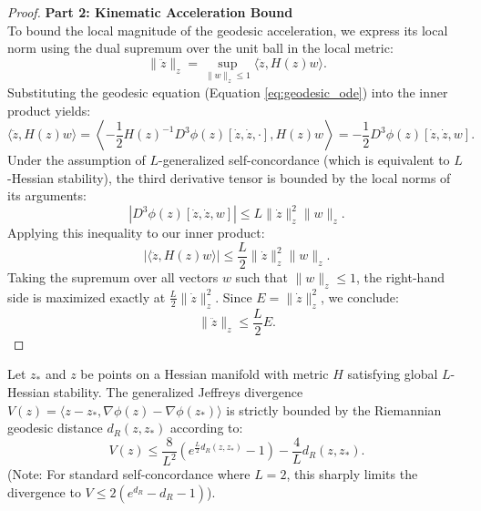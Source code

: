 \begin{proof}
\noindent \textbf{Part 2: Kinematic Acceleration Bound}\\
To bound the local magnitude of the geodesic acceleration, we express its local norm using the dual supremum over the unit ball in the local metric:
\begin{equation}
    \|\ddot{z}\|_z = \sup_{\|w\|_z \le 1} \langle \ddot{z}, H(z)w \rangle.
\end{equation}
Substituting the geodesic equation (Equation \ref{eq:geodesic_ode}) into the inner product yields:
\begin{equation}
    \langle \ddot{z}, H(z)w \rangle = \left\langle -\frac{1}{2} H(z)^{-1} D^3\phi(z)[\dot{z}, \dot{z}, \cdot], H(z)w \right\rangle = -\frac{1}{2} D^3\phi(z)[\dot{z}, \dot{z}, w].
\end{equation}
Under the assumption of $L$-generalized self-concordance (which is equivalent to $L$-Hessian stability), the third derivative tensor is bounded by the local norms of its arguments:
\begin{equation}
    |D^3\phi(z)[\dot{z}, \dot{z}, w]| \le L \|\dot{z}\|_z^2 \|w\|_z.
\end{equation}
Applying this inequality to our inner product:
\begin{equation}
    | \langle \ddot{z}, H(z)w \rangle | \le \frac{L}{2} \|\dot{z}\|_z^2 \|w\|_z.
\end{equation}
Taking the supremum over all vectors $w$ such that $\|w\|_z \le 1$, the right-hand side is maximized exactly at $\frac{L}{2}\|\dot{z}\|_z^2$. Since $E = \|\dot{z}\|_z^2$, we conclude:
\begin{equation}
    \|\ddot{z}\|_z \le \frac{L}{2} E.
\end{equation}
\end{proof}


\begin{lemma}
\label{lem:sharp_divergence_bound}
Let $z_*$ and $z$ be points on a Hessian manifold with metric $H$ satisfying global $L$-Hessian stability. The generalized Jeffreys divergence $V(z) = \langle z - z_* , \nabla \phi(z) - \nabla \phi(z_*) \rangle$ is strictly bounded by the Riemannian geodesic distance $d_R(z, z_*)$ according to:
\begin{equation}
    V(z) \le \frac{8}{L^2} \left( e^{\frac{L}{2} d_R(z, z_*)} - 1 \right) - \frac{4}{L} d_R(z, z_*).
\end{equation}
(Note: For standard self-concordance where $L=2$, this sharply limits the divergence to $V \le 2(e^{d_R} - d_R - 1)$).
\end{lemma}

